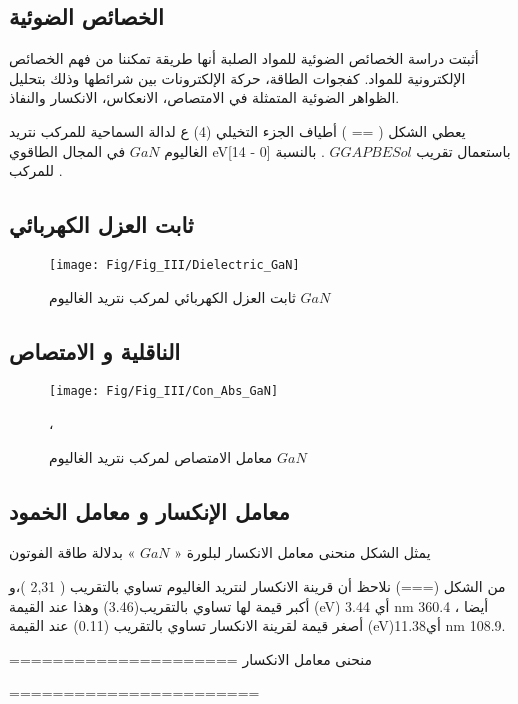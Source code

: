 \subsection{الخصائص الضوئية}

أثبتت دراسة الخصائص الضوئية للمواد الصلبة أنها طريقة تمكننا من فهم الخصائص الإلكترونية للمواد. كفجوات الطاقة، حركة الإلكترونات بين شرائطها وذلك بتحليل الظواهر الضوئية المتمثلة في الامتصاص، الانعكاس، الانكسار والنفاذ.

يعطي الشكل ( == ) أطياف الجزء التخيلي (4) ع لدالة السماحية للمركب نتريد الغاليوم  $ GaN  $  في المجال الطاقوي eV[14 - 0] باستعمال تقريب $ GGAPBESol $ .
بالنسبة للمركب . 

\subsection*{ثابت العزل الكهربائي }

\begin{figure}[h!]
	\centering
	\texttt{[image: Fig/Fig\_III/Dielectric\_GaN]}
	\caption{ ثابت العزل الكهربائي لمركب نتريد الغاليوم  $ GaN $  }
	\label{fig:dielectricgan}
\end{figure}
\FloatBarrier

\subsection*{الناقلية و الامتصاص}

\begin{figure}[h!]
	\centering
	\texttt{[image: Fig/Fig\_III/Con\_Abs\_GaN]}
	\caption{معامل الامتصاص لمركب نتريد الغاليوم  $ GaN $ }، 
	\label{fig:conabsgan}
\end{figure}
\FloatBarrier

\subsection*{معامل الإنكسار و معامل الخمود}
يمثل الشكل منحنى معامل الانكسار لبلورة « $ GaN $ » بدلالة طاقة الفوتون

من الشكل (===) نلاحظ أن قرينة الانكسار لنتريد الغاليوم تساوي بالتقريب ( 2,31 )،و أكبر قيمة لها تساوي بالتقريب(3.46) وهذا عند القيمة (eV) 3.44   أي  nm 360.4 ، أيضا أصغر قيمة لقرينة الانكسار تساوي بالتقريب (0.11) عند القيمة (eV)11.38أي nm 108.9.

=====================
منحنى معامل الانكسار

=======================


